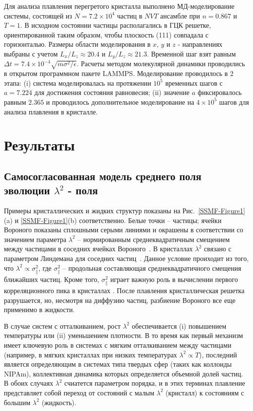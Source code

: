 Для анализа плавления перегретого кристалла выполнено МД-моделирование системы, состоящей из $ N = 7.2 \times 10 ^ 4 $ частиц в $NVT$ ансамбле при $n=0.867$ и $T=1$.
В исходном состоянии частицы располагались в ГЦК решетке, ориентированной таким образом, чтобы плоскость (111) совпадала с горизонталью.
Размеры области моделирования в $ x $, $ y $ и $ z $ - направлениях выбраны с учетом $ L_x / L_z \approx 20.4 $ и $ L_y / L_z \approx 21.3 $.
Временной шаг взят равным $ \Delta t = 7.4 \times 10 ^ {- 4} \sqrt {m \sigma ^ 2 / \epsilon}$.
Расчеты методом молекулярной динамики проводились в открытом программном пакете LAMMPS.
Моделирование проводилось в 2 этапа: (i) система моделировалась на протяжении $ 10 ^ 5 $ временных шагов с $ a = 7.224 $ для достижения состояния равновесия; (ii) значение $a$ фиксировалось равным $ 2.365 $ и проводилось дополнительное моделирование на $ 4 \times 10 ^ 5 $ шагов для анализа плавления в кристалле.

\section{Результаты}
\subsection{Самосогласованная модель среднего поля эволюции $\lambda^2$ - поля}

Примеры кристаллических и жидких структур показаны на Рис.~\ref{SSMF-Figure1}(a) и \ref{SSMF-Figure1}(b) соответственно.
Белые точки -- частицы; ячейки Вороного показаны сплошными серыми линиями и окрашены в соответствии со значением параметра $\lambda^2$ -- нормированным среднеквадратичным смещением между частицами в соседних ячейках Вороного~\cite{10.1021/acs.jpcc.7b09317}.
В кристаллах $\lambda^2$ связано с параметром Линдемана для соседних частиц~\cite{10.1016/0375-9601(85)90617-6}.
Данное условие проиходит из того, что $\lambda^2\propto \sigma_ \| ^ 2 $, где $ \sigma_ \| ^ 2 $ -- продольная составляющая среднеквадратичного смещения ближайших частиц.
Кроме того, $ \sigma_ \| ^ 2 $ играет важную роль в вычислении первого корреляционного пика в кристаллах \cite{10.1063/1.4869863, 10.1063/1.4926945, 10.1088/0953-8984/28/23/235401, 10.1039/c7sm02429k, 10.1063/1.5116176}.
После плавления кристаллическая решетка разрушается, но, несмотря на диффузию частиц, разбиение Вороного все еще применимо в жидкости.

В случае систем с отталкиванием, рост $\lambda^2$ обеспечивается (i) повышением температуры или (ii) уменьшением плотности.
В то время как первый механизм имеет ключевую роль в системах с мягким отталкиванием между частицами (например, в мягких кристаллах при низких температурах $\lambda^2\propto T $), последний является определяющим в системах типа твердых сфер (таких как коллоиды NIPAm), коллективная динамика которых определяется объемной долей частиц.
В обоих случаях $\lambda^2$ счиатется параметром порядка, и в этих терминах плавление представляет собой переход от состояний с малым $\lambda^2$ (кристалл) к состояниям с большим $\lambda^2$ (жидкость).

